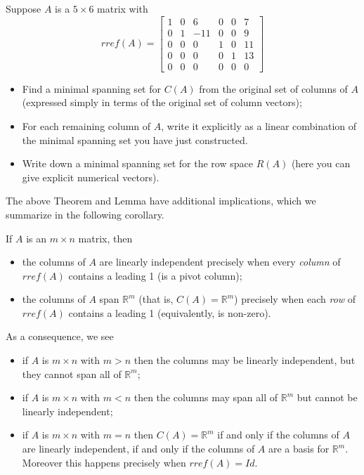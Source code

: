 \documentclass{ximera}
\begin{document}
\begin{exercise} Suppose $A$ is a $5\times 6$ matrix with
\[
rref(A) = \begin{bmatrix}
1 & 0 & 6 & 0 & 0 & 7\\
0 & 1 & -11 & 0 & 0 & 9\\
0 & 0 & 0 & 1 & 0 & 11\\
0 & 0 & 0 & 0 & 1 & 13\\
0 & 0 & 0 & 0 & 0 & 0
\end{bmatrix}
\]
\begin{itemize}
\item Find a minimal spanning set for $C(A)$ from the original set of columns of $A$ (expressed simply in terms of the original set of column vectors);
\item For each remaining column of $A$, write it explicitly as a linear combination of the minimal spanning set you have just constructed.
\item Write down a minimal spanning set for the row space $R(A)$ (here you can give explicit numerical vectors).
\end{itemize}

\end{exercise}



The above Theorem and Lemma have additional implications, which we summarize in the following corollary.


\begin{corollary}If $A$ is an $m\times n$ matrix, then 
\begin{itemize}
\item the columns of $A$ are linearly independent precisely when every {\it column} of $rref(A)$ contains a leading 1 (is a pivot column);
\item the columns of $A$ span $\mathbb R^m$ (that is, $C(A) = \mathbb R^m$) precisely when each {\it row} of $rref(A)$ contains a leading 1 (equivalently, is non-zero).
\end{itemize}
As a consequence, we see
\begin{itemize}
\item if $A$ is $m\times n$ with $m > n$ then the columns may be linearly independent, but they cannot span all of $\mathbb R^m$;
\item if $A$ is $m\times n$ with $m < n$ then the columns may span all of $\mathbb R^m$ but cannot be linearly independent;
\item if $A$ is $m\times n$ with $m = n$ then $C(A) = \mathbb R^m$ if and only if the columns of $A$ are linearly independent, if and only if the columns of $A$ are a basis for $\mathbb R^m$. Moreover this happens precisely when $rref(A) = Id$.
\end{itemize}
\end{corollary}
\end{document}
